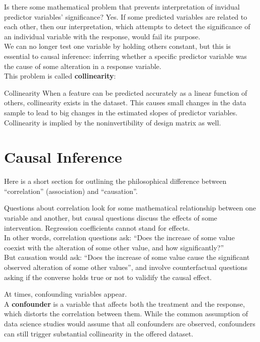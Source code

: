 Is there some mathematical problem that prevents interpretation of invidual predictor variables' significance? Yes. 
If some predicted variables are related to each other, then our interpretation, which attempts to detect the significance of an individual variable with the response, would fail its purpose. \\
We can no longer test one variable by holding others constant, but this is essential to causal inference: inferring whether a specific predictor variable was the cause of some alteration in a response variable. \\
This problem is called \textbf{collinearity}:
\begin{ln-define}{Collinearity}{}
    When a feature can be predicted accurately as a linear function of others, collinearity exists in the dataset. 
    This causes small changes in the data sample to lead to big changes in the estimated slopes of predictor variables. \\
    Collinearity is implied by the noninvertibility of design matrix as well.
\end{ln-define}

\section{Causal Inference}
Here is a short section for outlining the philosophical difference between ``correlation'' (association) and ``causation''.

Questions about correlation look for some mathematical relationship between one variable and another, but causal questions discuss the effects of some intervention. Regression coefficients cannot stand for effects. \\
In other words, correlation questions ask: ``Does the increase of some value coexist with the alteration of some other value, and how significantly?'' \\
But causation would ask: ``Does the increase of some value cause the significant observed alteration of some other values'', and involve counterfactual questions asking if the converse holds true or not to validify the causal effect.

At times, confounding variables appear. \\
A \textbf{confounder} is a variable that affects both the treatment and the response, which distorts the correlation between them. While the common assumption of data science studies would assume that all confounders are observed, confounders can still trigger substantial collinearity in the offered dataset.

